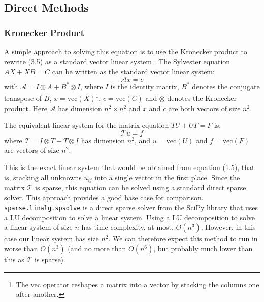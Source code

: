 \documentclass[11pt]{article}
\numberwithin{equation}{section}
\begin{document}
\subsection{Direct Methods}

\subsubsection{Kronecker Product}
A simple approach to solving this equation is to use the Kronecker product to rewrite (3.5) as a standard vector linear system \cite{Laub}. The Sylvester equation $AX + XB = C$ can be written as the standard vector linear system:
\begin{equation}
\mathcal{A}x = c
\end{equation}
with $\mathcal{A} = I \otimes A + B^* \otimes I$, where $I$ is the identity matrix, $B^*$ denotes the conjugate transpose of $B$, $x = \text{vec}(X)$\footnote{The vec operator reshapes a matrix into a vector by stacking the columns one after another.}, $c = \text{vec}(C)$ and $\otimes$ denotes the Kronecker product. Here $\mathcal{A}$ has dimension $n^2 \times n^2$ and $x$ and $c$ are both vectors of size $n^2$.

The equivalent linear system for the matrix equation $TU + UT = F$ is:
\begin{equation}
\mathcal{T}u = f
\end{equation}
where $\mathcal{T} = I \otimes T + T \otimes I$ has dimension $n^2$, and $u = \text{vec}(U)$ and $f = \text{vec}(F)$ are vectors of size $n^2$.

This is the exact linear system that would be obtained from equation (1.5), that is, stacking all unknowns $u_{ij}$ into a single vector in the first place. Since the matrix $\mathcal{T}$ is sparse, this equation can be solved using a standard direct sparse solver. This approach provides a good base case for comparison. \texttt{sparse.linalg.spsolve} is a direct sparse solver from the SciPy library that uses a LU decomposition to solve a linear system. Using a LU decomposition to solve a linear system of size $n$ has time complexity, at most, $O(n^3)$. However, in this case our linear system has size $n^2$. We can therefore expect this method to run in worse than $O(n^3)$ (and no more than $O(n^6)$, but probably much lower than this as $\mathcal{T}$ is sparse).
\end{document}
